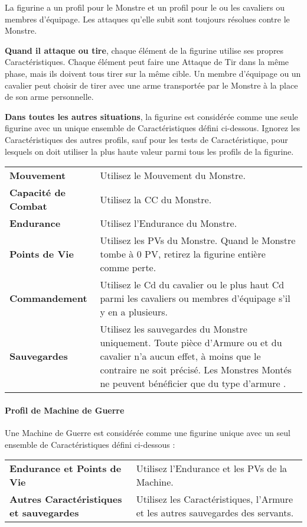 La figurine a un profil pour le Monstre et un profil pour le ou les cavaliers ou membres d'équipage. Les attaques qu'elle subit sont toujours résolues contre le Monstre.

\textbf{Quand il attaque ou tire}, chaque élément de la figurine utilise ses propres Caractéristiques. Chaque élément peut faire une Attaque de Tir dans la même phase, mais ils doivent tous tirer sur la même cible. Un membre d'équipage ou un cavalier peut choisir de tirer avec une arme transportée par le Monstre à la place de son arme personnelle.

\textbf{Dans toutes les autres situations}, la figurine est considérée comme une seule figurine avec un unique ensemble de Caractéristiques défini ci-dessous. Ignorez les Caractéristiques des autres profils, sauf pour les tests de Caractéristique, pour lesquels on doit utiliser la plus haute valeur parmi tous les profils de la figurine.

\vspace*{10pt}
\renewcommand{\arraystretch}{2.5}
\begin{center}
\begin{tabular}{>{\bfseries\raggedleft}p{3cm}p{12cm}}
\hline
Mouvement & Utilisez le Mouvement du Monstre. \tabularnewline
Capacité de Combat & Utilisez la CC du Monstre. \tabularnewline
Endurance & Utilisez l'Endurance du Monstre. \tabularnewline
Points de Vie & Utilisez les PVs du Monstre. Quand le Monstre tombe à 0 PV, retirez la figurine entière comme perte. \tabularnewline
Commandement & Utilisez le Cd du cavalier ou le plus haut Cd parmi les cavaliers ou membres d'équipage s'il y en a plusieurs. \tabularnewline
Sauvegardes & Utilisez les sauvegardes du Monstre uniquement. Toute pièce d'Armure ou \regeneration{} et \wardsave{} du cavalier n'a aucun effet, à moins que le contraire ne soit précisé. Les Monstres Montés ne peuvent bénéficier que du type d'armure \innatedefence{}. \tabularnewline
\hline
\end{tabular}\end{center}
\renewcommand{\arraystretch}{1.5}

\newpage
\paragraph{Profil de Machine de Guerre}

Une Machine de Guerre est considérée comme une figurine unique avec un seul ensemble de Caractéristiques défini ci-dessous :

\vspace*{10pt}
\renewcommand{\arraystretch}{2.5}
\begin{center}
\begin{tabular}{>{\bfseries\raggedleft}p{4.5cm}p{10.5cm}}
\hline
Endurance et Points de Vie & Utilisez l'Endurance et les PVs de la Machine. \tabularnewline
Autres Caractéristiques et sauvegardes & Utilisez les Caractéristiques, l'Armure et les autres sauvegardes des servants. \tabularnewline
\hline
\end{tabular}\end{center}
\renewcommand{\arraystretch}{1.5}
\vspace*{10pt}


